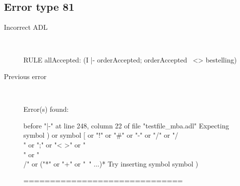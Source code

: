 \hrulefill

\subsection{Error type 81}
  \begin{description}
  \item[Incorrect ADL]~\\
\begin{adl}
RULE allAccepted: (I |- orderAccepted; orderAccepted~ <> bestelling) \end{adl}
  \item[Previous error]~\\
\begin{haskell}
Error(s) found:

before "|-" at line 248, column 22 of file "testfile_mba.adl"
Expecting symbol ) or symbol [ or "!" or "#" or "-" or "/" or "/\\" or ";" or "<
>" or "\\" or "\\/" or ("*" or "+" or "~" ...)*
Try inserting symbol symbol )

==============================


\end{haskell}
\end{description}
